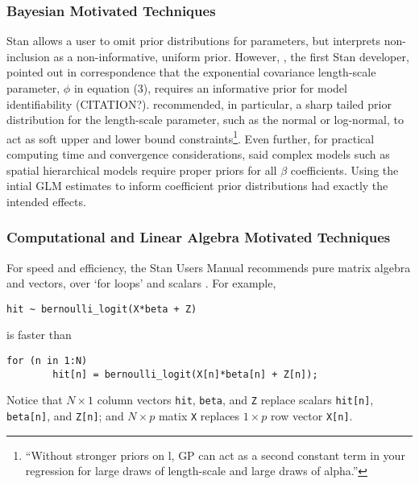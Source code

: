 \documentclass{article}
\begin{document}
\subsubsection*{Bayesian Motivated Techniques} %

Stan allows a user to omit prior distributions for parameters, but interprets non-inclusion as a non-informative, uniform prior. However, \cite{Gelman}, the first Stan developer, pointed out in correspondence that the exponential covariance length-scale parameter, $\phi$ in equation (3), requires an informative prior for model identifiability (CITATION?). \cite{Trangucci} recommended, in particular, a sharp tailed prior distribution for the length-scale parameter, such as the normal or log-normal, to act as soft upper and lower bound constraints\footnote{``Without stronger priors on l, GP can act as a second constant term in your regression for large draws of length-scale and large draws of alpha.''}. Even further, for practical computing time and convergence considerations, \cite{Trangucci} said complex models such as spatial hierarchical models require proper priors for all $\beta$ coefficients. Using the intial GLM estimates to inform coefficient prior distributions had exactly the intended effects.

\subsubsection*{Computational and Linear Algebra Motivated Techniques} %
For speed and efficiency, the Stan Users Manual recommends pure matrix algebra and vectors, over `for loops' and scalars \cite{StantheMAN}. For example, 
\begin{verbatim}
hit ~ bernoulli_logit(X*beta + Z)
\end{verbatim}
is faster than
\begin{verbatim}
for (n in 1:N)
        hit[n] = bernoulli_logit(X[n]*beta[n] + Z[n]);
\end{verbatim}
Notice that $N \times 1$ column vectors \verb|hit|, \verb|beta|, and \verb|Z| replace scalars \verb|hit[n]|, \verb|beta[n]|, and \verb|Z[n]|; and $N \times p$ matix \verb|X| replaces $1 \times p$ row vector \verb|X[n]|.
\end{document}
